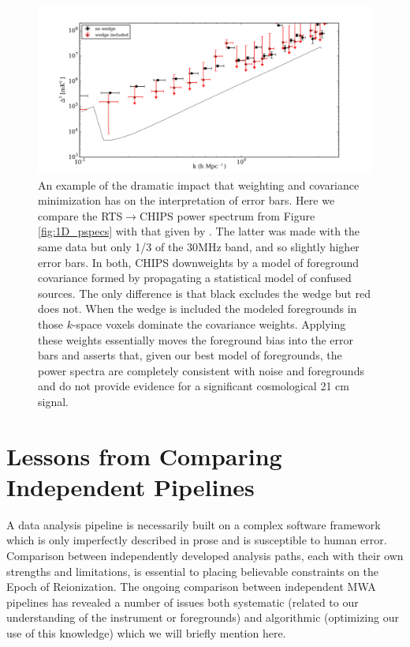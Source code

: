 \documentclass[twolcolumn,iop]{emulateapj}
\def\chipscite{\cite{2016arXiv160102073T}}
\begin{document}
\begin{figure}[htbp]
\begin{center}
\includegraphics[width=\textwidth]{figures/MWA_PS_Compare/MWAPipeline_compare_1d_radial_chips_pub.png}
\caption{An example of the dramatic impact that weighting and covariance minimization has on the interpretation of error bars.  Here we compare the RTS$\to$CHIPS power spectrum from Figure \ref{fig:1D_pspecs} with that given by \chipscite{}. The latter was made with the same data but only 1/3 of the 30MHz band, and so slightly higher error bars.  In both, CHIPS downweights by a model of foreground covariance formed by propagating a statistical model of confused sources. The only difference is that black excludes the wedge but red does not. When the wedge is included the modeled foregrounds in those $k$-space voxels dominate the covariance weights. Applying these weights essentially moves the foreground bias into the error bars and asserts that, given our best model of foregrounds, the power spectra are completely consistent with noise and foregrounds and do not provide evidence for a significant cosmological 21 cm signal.}
\label{fig:CHIPS_compare}
\end{center}
\end{figure}

\section{Lessons from Comparing Independent Pipelines}
\label{sec:lessons}
          A data analysis pipeline is necessarily built on a complex software framework which is only imperfectly described in prose and is susceptible to human error.  Comparison between independently developed analysis paths, each with their own strengths and limitations, is essential to placing believable constraints on the Epoch of Reionization. The ongoing comparison between independent MWA pipelines has revealed a number of issues both systematic (related to our understanding of the instrument or foregrounds) and algorithmic (optimizing our use of this knowledge) which we will briefly mention here.
      
\end{document}
